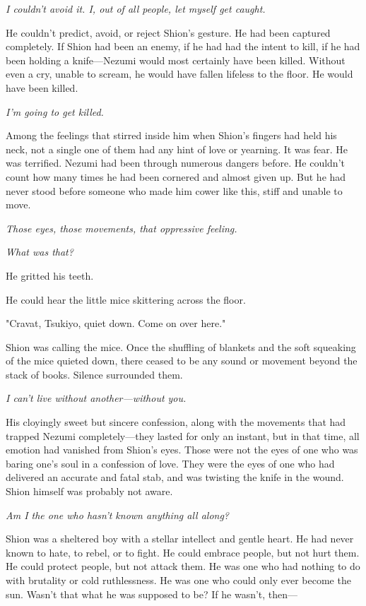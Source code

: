 \emph{I couldn't avoid it. I, out of all people, let myself get caught.}

He couldn't predict, avoid, or reject Shion's gesture. He had been
captured completely. If Shion had been an enemy, if he had had the
intent to kill, if he had been holding a knife---Nezumi would most
certainly have been killed. Without even a cry, unable to scream, he
would have fallen lifeless to the floor. He would have been killed.

\emph{I'm going to get killed.}

Among the feelings that stirred inside him when Shion's fingers had held
his neck, not a single one of them had any hint of love or yearning. It
was fear. He was terrified. Nezumi had been through numerous dangers
before. He couldn't count how many times he had been cornered and almost
given up. But he had never stood before someone who made him cower like
this, stiff and unable to move.

\emph{Those eyes, those movements, that oppressive feeling.}

\emph{What was that?}

He gritted his teeth.

He could hear the little mice skittering across the floor.

"Cravat, Tsukiyo, quiet down. Come on over here."

Shion was calling the mice. Once the shuffling of blankets and the soft
squeaking of the mice quieted down, there ceased to be any sound or
movement beyond the stack of books. Silence surrounded them.

\emph{I can't live without another---without you.}

His cloyingly sweet but sincere confession, along with the movements
that had trapped Nezumi completely---they lasted for only an instant, but
in that time, all emotion had vanished from Shion's eyes. Those were not
the eyes of one who was baring one's soul in a confession of love. They
were the eyes of one who had delivered an accurate and fatal stab, and
was twisting the knife in the wound. Shion himself was probably not
aware.

\emph{Am I the one who hasn't known anything all along?}

Shion was a sheltered boy with a stellar intellect and gentle heart. He
had never known to hate, to rebel, or to fight. He could embrace people,
but not hurt them. He could protect people, but not attack them. He was
one who had nothing to do with brutality or cold ruthlessness. He was
one who could only ever become the sun. Wasn't that what he was supposed
to be? If he wasn't, then---

